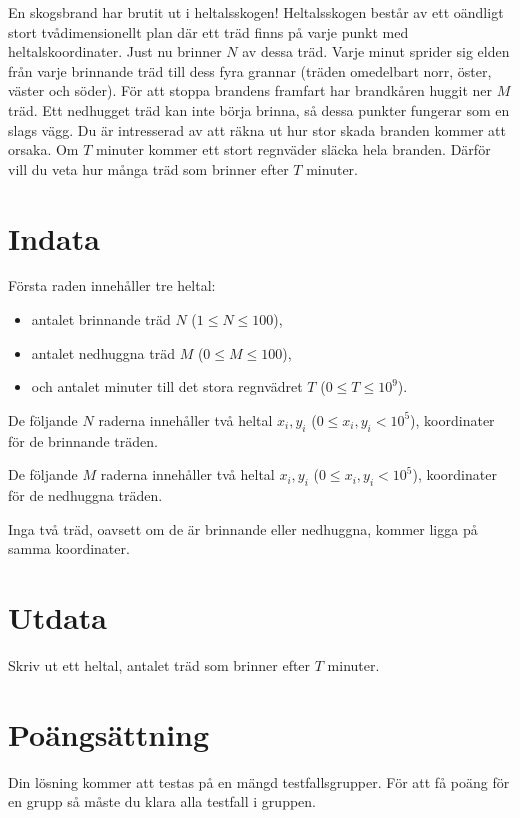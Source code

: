 \def\version{jury-2}
\noindent
En skogsbrand har brutit ut i heltalsskogen!
Heltalsskogen består av ett oändligt stort tvådimensionellt plan där ett träd finns på varje punkt med heltalskoordinater.
Just nu brinner $N$ av dessa träd.
Varje minut sprider sig elden från varje brinnande träd till dess fyra grannar (träden omedelbart norr, öster, väster och söder).
För att stoppa brandens framfart har brandkåren huggit ner $M$ träd.
Ett nedhugget träd kan inte börja brinna, så dessa punkter fungerar som en slags vägg.
Du är intresserad av att räkna ut hur stor skada branden kommer att orsaka.
Om $T$ minuter kommer ett stort regnväder släcka hela branden.
Därför vill du veta hur många träd som brinner efter $T$ minuter.

\section*{Indata}
Första raden innehåller tre heltal:
\begin{itemize}
        \item antalet brinnande träd $N$ ($1 \leq N \leq 100$),
        \item antalet nedhuggna träd $M$ ($0 \leq M \leq 100$),
        \item och antalet minuter till det stora regnvädret $T$ ($0 \leq T \leq 10^9$).
\end{itemize}

De följande $N$ raderna innehåller två heltal $x_i,y_i$ ($0 \leq x_i, y_i < 10^5$), koordinater för de brinnande träden.

De följande $M$ raderna innehåller två heltal $x_i,y_i$ ($0 \leq x_i, y_i < 10^5$), koordinater för de nedhuggna träden.

Inga två träd, oavsett om de är brinnande eller nedhuggna, kommer ligga på samma koordinater.

\section*{Utdata}
Skriv ut ett heltal, antalet träd som brinner efter $T$ minuter.

\section*{Poängsättning}
Din lösning kommer att testas på en mängd testfallsgrupper.
För att få poäng för en grupp så måste du klara alla testfall i gruppen.

